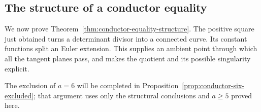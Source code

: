 \subsection{The structure of a conductor equality}
\label{subsec:conductor-equality-structure}

We now prove Theorem~\ref{thm:conductor-equality-structure}. The
positive square just obtained turns a determinant divisor into a
connected curve. Its constant functions split an Euler extension.
This supplies an ambient point through which all the tangent planes
pass, and makes the quotient and its possible singularity explicit.

The exclusion of $a=6$ will be completed in
Proposition~\ref{prop:conductor-six-excluded}; that argument uses
only the structural conclusions and $a\geq5$ proved here.

